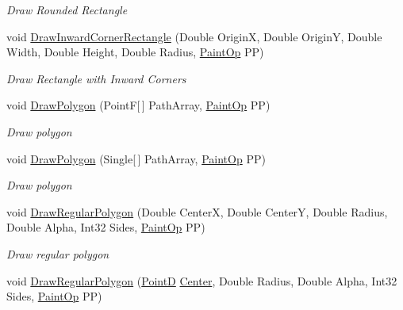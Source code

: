 \begin{DoxyCompactItemize}
\begin{DoxyCompactList}\small\item\em Draw Rounded Rectangle \end{DoxyCompactList}\item 
void \hyperlink{class_pdf_file_writer_1_1_pdf_contents_ab5bd74b5198136a44de890452d1ce79c}{Draw\+Inward\+Corner\+Rectangle} (Double OriginX, Double OriginY, Double Width, Double Height, Double Radius, \hyperlink{namespace_pdf_file_writer_a1bd0bc3fdabed20e2459496f1bbe2101}{Paint\+Op} PP)
\begin{DoxyCompactList}\small\item\em Draw Rectangle with Inward Corners \end{DoxyCompactList}\item 
void \hyperlink{class_pdf_file_writer_1_1_pdf_contents_a0799129df97f671d10386385a7801557}{Draw\+Polygon} (PointF\mbox{[}$\,$\mbox{]} Path\+Array, \hyperlink{namespace_pdf_file_writer_a1bd0bc3fdabed20e2459496f1bbe2101}{Paint\+Op} PP)
\begin{DoxyCompactList}\small\item\em Draw polygon \end{DoxyCompactList}\item 
void \hyperlink{class_pdf_file_writer_1_1_pdf_contents_a683e277642d3ec435faf77fb3774d589}{Draw\+Polygon} (Single\mbox{[}$\,$\mbox{]} Path\+Array, \hyperlink{namespace_pdf_file_writer_a1bd0bc3fdabed20e2459496f1bbe2101}{Paint\+Op} PP)
\begin{DoxyCompactList}\small\item\em Draw polygon \end{DoxyCompactList}\item 
void \hyperlink{class_pdf_file_writer_1_1_pdf_contents_a4374edf93e3e111e1788370c1b315122}{Draw\+Regular\+Polygon} (Double CenterX, Double CenterY, Double Radius, Double Alpha, Int32 Sides, \hyperlink{namespace_pdf_file_writer_a1bd0bc3fdabed20e2459496f1bbe2101}{Paint\+Op} PP)
\begin{DoxyCompactList}\small\item\em Draw regular polygon \end{DoxyCompactList}\item 
void \hyperlink{class_pdf_file_writer_1_1_pdf_contents_ab341ca3cde6af036b3a82d81c4380229}{Draw\+Regular\+Polygon} (\hyperlink{class_pdf_file_writer_1_1_point_d}{PointD} \hyperlink{namespace_pdf_file_writer_a3991bfacc8c7be240452dd24ec817157a4f1f6016fc9f3f2353c0cc7c67b292bd}{Center}, Double Radius, Double Alpha, Int32 Sides, \hyperlink{namespace_pdf_file_writer_a1bd0bc3fdabed20e2459496f1bbe2101}{Paint\+Op} PP)

\end{DoxyCompactItemize}
